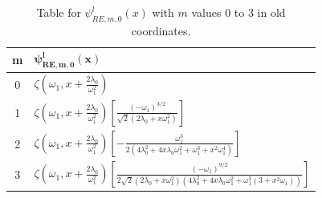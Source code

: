 \documentclass[a4paper, 12pt]{article}
\begin{document}
\begin{table}[htp]%
  \centering
  \renewcommand{\arraystretch}{2} %
  \setlength{\tabcolsep}{1em} %
  \begin{tabularx}{\textwidth}{|c|X|}
    \toprule
    {\bf m} & $\mathbf{\psi_{RE,m,0}^l(x)}$ \\
    \toprule
    0 & $\zeta\left(\omega_1,x + \frac{2\lambda_0}{\omega_1^2}\right)$ \\
    \midrule
    1 & $\zeta\left(\omega_1,x + \frac{2\lambda_0}{\omega_1^2}\right)\left[\frac{(-\omega_1)^{3/2}}{\sqrt{2} (2 \lambda_0 + x \omega_1^2)}\right]$ \\
    \midrule
    2 & $\zeta\left(\omega_1,x + \frac{2\lambda_0}{\omega_1^2}\right)\left[-\frac{\omega_1^3}{2 (4 \lambda_0^2 + 4 x \lambda_0 \omega_1^2 + \omega_1^3 + x^2 \omega_1^4)}\right]$ \\
    \midrule
    3 & $\zeta\left(\omega_1,x + \frac{2\lambda_0}{\omega_1^2}\right)\left[\frac{(-\omega_1)^{9/2}}{2 \sqrt{2} (2 \lambda_0 + x \omega_1^2) (4 \lambda_0^2 + 4 x \lambda_0 \omega_1^2 + \omega_1^3 (3 + x^2 \omega_1))}\right]$ \\
    \bottomrule
  \end{tabularx}
  \caption{Table for $\psi_{RE,m,0}^l(x)$ with $m$ values 0 to 3 in old coordinates.}
  \label{Tab:1D-psi0-}
\end{table}
\end{document}
